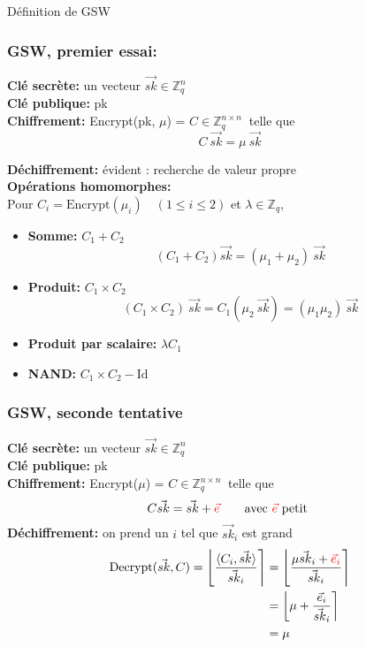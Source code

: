 \documentclass[10pt,xcolor={usenames,dvipsnames}]{beamer}
\newcommand{\ZZq}{\mathbb{Z}_q}
\begin{document}

\begin{section}{Définition de GSW}

\begin{frame} 
\frametitle{GSW, premier essai:}
\textbf{Clé secrète:} un vecteur $\vec{sk} \in \ZZq^{n}$ \\
\textbf{Clé publique:} pk\\
\textbf{Chiffrement:} Encrypt(pk, $\mu$) = $C\in \ZZq^{n \times n}\:$ telle que  
\[C\: \vec{sk} = \mu\:\vec{sk}\]
\vspace{-0.6cm}

\textbf{Déchiffrement:} évident : recherche de valeur propre \\
\textbf{Opérations homomorphes:}\\
Pour {\small$C_i = \text{Encrypt}(\mu_i) \quad(1 \leqslant i \leqslant 2)$}
et $\lambda \in \ZZq$,
\begin{itemize}
\item \textbf{Somme:} $C_1 + C_2\quad$
\[\left(C_1 + C_2\right) \vec{sk} = (\mu_1 + \mu_2)\: \vec{sk}\]
\item \textbf{Produit:} $C_1 \times C_2\quad$
\[\left(C_1 \times C_2\right)\: \vec{sk} = C_1\left(\mu_2\:\vec{sk}\right) = (\mu_1 \mu_2)\:\vec{sk}\]
\item \textbf{Produit par scalaire:} $\lambda C_1\quad$
\item \textbf{NAND:} $C_1 \times C_2 - \text{Id}$
\end{itemize}
\end{frame} 


\begin{frame} 
\frametitle{GSW, seconde tentative}
\textbf{Clé secrète:} un vecteur $\vec{sk} \in \ZZq^{n}$ \\
\textbf{Clé publique:} pk\\
\textbf{Chiffrement:} Encrypt($\mu$) = $C\in \ZZq^{n \times n}\:$ telle que  
\[C \vec{sk} = \vec{sk} + {\color{red}\vec{e}}\qquad \text{avec }  {\color{red}\vec{e}} \text{ petit} \]
\textbf{Déchiffrement:} on prend un $i$ tel que $\vec{sk}_i$ est grand
\begin{align*}
\text{Decrypt}(\vec{sk}, C) = \left\lfloor \frac{\langle C_i, \vec{sk}\rangle}{\vec{sk}_i} \right\rceil &= 
\left\lfloor \frac{{\mu\vec{sk}_i + {\color{red}\vec{e}_i}}}{\vec{sk}_i} \right\rceil \\
&= \left\lfloor \mu + \frac{\vec{e}_i}{\vec{sk}_i} \right\rceil \\
&= \mu
\end{align*}
\end{frame} 


\end{section}
\end{document}
